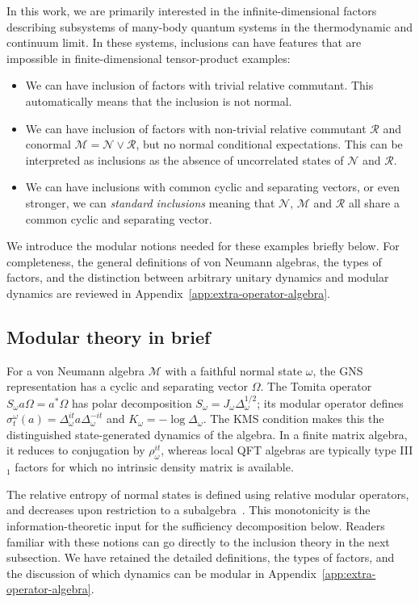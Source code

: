 \documentclass[a4paper,11pt]{article}
\theoremstyle{definition}
\newcommand{\mR}{\mathcal{R}}
\newcommand{\mN}{\mathcal{N}}
\newcommand{\mM}{\mathcal{M}}
\begin{document}
In this work, we are primarily interested in the infinite-dimensional factors describing
subsystems of many-body quantum systems in the thermodynamic and continuum limit.
In these systems, inclusions can have features that are impossible in
finite-dimensional tensor-product examples: 
\begin{itemize}
\item We can have inclusion of factors with trivial relative commutant. This automatically means that the inclusion is not normal.

\item We can have inclusion of factors with non-trivial relative commutant $\mR$ and conormal $\mM=\mN\vee \mR$, but no normal conditional expectations. This can be interpreted as inclusions as the absence of uncorrelated states of $\mN$ and $\mR$.

\item We can have inclusions with common cyclic and separating vectors, or even stronger, we can {\it standard inclusions} meaning that $\mN$, $\mM$ and $\mR$ all share a common cyclic and separating vector.
\end{itemize}
We introduce the modular notions needed for these examples briefly below.
For completeness, the general definitions of von Neumann algebras, the
types of factors, and the distinction between arbitrary unitary dynamics
and modular dynamics are reviewed in Appendix~\ref{app:extra-operator-algebra}.

\subsection{Modular theory in brief}
For a von Neumann algebra $\mM$ with a faithful normal state $\omega$, the GNS representation has a cyclic and separating vector $\Omega$. The Tomita operator $S_\omega a\Omega=a^*\Omega$ has polar decomposition $S_\omega=J_\omega\Delta_\omega^{1/2}$; its modular operator defines $\sigma_t^\omega(a)=\Delta_\omega^{it}a\Delta_\omega^{-it}$ and $K_\omega=-\log\Delta_\omega$. The KMS condition makes this the distinguished state-generated dynamics of the algebra. In a finite matrix algebra, it reduces to conjugation by $\rho_\omega^{it}$, whereas local QFT algebras are typically type III$_1$ factors for which no intrinsic density matrix is available.

The relative entropy of normal states is defined using relative modular operators, and decreases upon restriction to a subalgebra~\cite{Araki1976,Araki1977}. This monotonicity is the information-theoretic input for the sufficiency decomposition below. Readers familiar with these notions can go directly to the inclusion theory in the next subsection. We have retained the detailed definitions, the types of factors, and the discussion of which dynamics can be modular in Appendix~\ref{app:extra-operator-algebra}.
\end{document}
